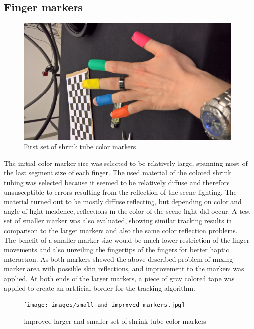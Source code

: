 \subsection{Finger markers}
\begin{figure} 
\centering
\includegraphics[width=\textwidth/2,angle=-90]{images/color_markers_hand.jpg}
\caption{First set of shrink tube color markers }
\label{img:first_set_color_markers}
\end{figure}
The initial color marker size was selected to be relatively large, spanning most of the last segment size of each finger.
The used material of the colored shrink tubing was selected because it seemed to be relatively diffuse and therefore unsusceptible to errors resulting from the reflection of the scene lighting. The material turned out to be mostly diffuse reflecting, but depending on color and angle of light incidence, reflections in the color of the scene light did occur.
A test set of smaller marker was also evaluated, showing similar tracking results in comparison to the larger markers and also the same color reflection problems.\\The benefit of a smaller marker size would be much lower restriction of the finger movements and also unveiling the fingertips of the fingers for better haptic interaction.
As both markers showed the above described problem of mixing marker area with possible skin reflections, and improvement to the markers was applied. At both ends of the larger markers, a piece of gray colored tape was applied to create an artificial border for the tracking algorithm.
\begin{figure}[H]
\centering
\texttt{[image: images/small\_and\_improved\_markers.jpg]}
\caption{Improved larger and smaller set of shrink tube color markers }
\label{img:second_color_markers}
\end{figure}

